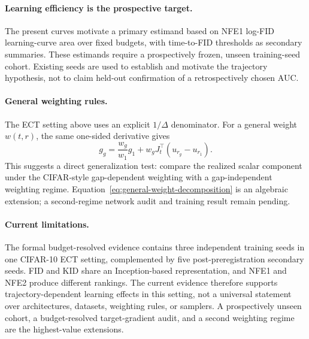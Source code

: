 \documentclass{article}
\newif\ifshowcomments
\newcommand{\todo}[1]{%
  \ifshowcomments{\color{todored}\textbf{[TODO: #1]}}\fi}
\begin{document}
\paragraph{Learning efficiency is the prospective target.}
The present curves motivate a primary estimand based on NFE1 log-FID
learning-curve area over fixed budgets, with time-to-FID thresholds as
secondary summaries. These estimands require a prospectively frozen, unseen
training-seed cohort. Existing seeds are used to establish and motivate the
trajectory hypothesis, not to claim held-out confirmation of a retrospectively
chosen AUC.

\paragraph{General weighting rules.}
The ECT setting above uses an explicit $1/\Delta$ denominator. For a general
weight $w(t,r)$, the same one-sided derivative gives
\begin{equation}
  g_g
  =\frac{w_g}{w_1}g_1
   +w_gJ_t^\top\left(u_{r_g}-u_{r_1}\right).
  \label{eq:general-weight-decomposition}
\end{equation}
This suggests a direct generalization test: compare the realized scalar
component under the CIFAR-style gap-dependent weighting with a
gap-independent weighting regime. Equation~\eqref{eq:general-weight-decomposition}
is an algebraic extension; a second-regime network audit and training result
remain pending.

\paragraph{Current limitations.}
The formal budget-resolved evidence contains three independent training seeds
in one CIFAR-10 ECT setting, complemented by five post-preregistration
secondary seeds. FID and KID share an Inception-based representation, and NFE1
and NFE2 produce different rankings. The current evidence therefore supports
trajectory-dependent learning effects in this setting, not a universal
statement over architectures, datasets, weighting rules, or samplers.
A prospectively unseen cohort, a budget-resolved target-gradient audit, and a
second weighting regime are the highest-value extensions.

\todo{Related-work owner: complete the citation audit for consistency
training, weighting schedules, finite-budget optimization, and adaptive
optimizer scale effects. Preserve the bounded novelty statement.}
\end{document}
